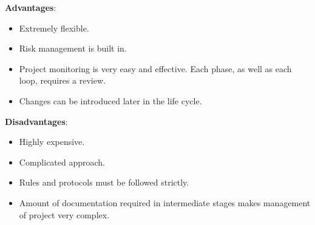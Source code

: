 \documentclass[a4paper, 12pt]{report}
\begin{document}
\textbf{Advantages}:
\begin{itemize}
\item Extremely flexible. 
\item Risk management is built in. 
\item Project monitoring is very easy and effective. Each phase, as well as each loop, requires a review.
\item Changes can be introduced later in the life cycle. 
\end{itemize}
\textbf{Disadvantages}:
\begin{itemize}
\item Highly expensive.
\item Complicated approach. 
\item Rules and protocols must be followed strictly.
\item Amount of documentation required in intermediate stages makes management of project very complex.
\end{itemize}
\end{document}
